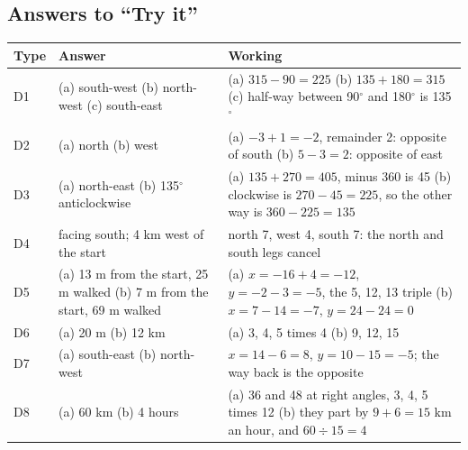 \documentclass[11pt,a4paper]{article}
\let\oldsubsection\subsection
\renewcommand{\subsection}{\needspace{9\baselineskip}\oldsubsection}
\begin{document}
\subsection*{Answers to ``Try it''}
\begin{center}\small\renewcommand{\arraystretch}{1.2}\setlength{\tabcolsep}{8pt}
\begin{tabularx}{\linewidth}{@{}l>{\raggedright\arraybackslash}X>{\raggedright\arraybackslash}X@{}}
\toprule
\textbf{\color{slate}Type} & \textbf{\color{slate}Answer} & \textbf{\color{slate}Working} \\ \midrule
D1 & (a) south-west \newline (b) north-west \newline (c) south-east & (a) $315 - 90 = 225$ \newline (b) $135 + 180 = 315$ \newline (c) half-way between 90$^\circ$ and 180$^\circ$ is 135$^\circ$ \\
D2 & (a) north \newline (b) west & (a) $-3 + 1 = -2$, remainder 2: opposite of south \newline (b) $5 - 3 = 2$: opposite of east \\
D3 & (a) north-east \newline (b) 135$^\circ$ anticlockwise & (a) $135 + 270 = 405$, minus 360 is 45 \newline (b) clockwise is $270 - 45 = 225$, so the other way is $360 - 225 = 135$ \\
D4 & facing south; 4 km west of the start & north 7, west 4, south 7: the north and south legs cancel \\
D5 & (a) 13 m from the start, 25 m walked \newline (b) 7 m from the start, 69 m walked & (a) $x = -16 + 4 = -12$, $y = -2 - 3 = -5$, the 5, 12, 13 triple \newline (b) $x = 7 - 14 = -7$, $y = 24 - 24 = 0$ \\
D6 & (a) 20 m \newline (b) 12 km & (a) 3, 4, 5 times 4 \newline (b) 9, 12, 15 \\
D7 & (a) south-east \newline (b) north-west & $x = 14 - 6 = 8$, $y = 10 - 15 = -5$; the way back is the opposite \\
D8 & (a) 60 km \newline (b) 4 hours & (a) 36 and 48 at right angles, 3, 4, 5 times 12 \newline (b) they part by $9 + 6 = 15$ km an hour, and $60 \div 15 = 4$ \\

\end{tabularx}
\end{center}
\end{document}
